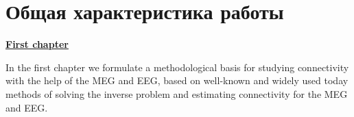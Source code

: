 
\section*{Общая характеристика работы}

\newcommand{\actuality}{\underline{\textbf{\actualityTXTEng}}}
\newcommand{\progress}{\underline{\textbf{\progressTXTEng}}}
\newcommand{\aim}{\underline{{\textbf\aimTXTEng}}}
\newcommand{\tasks}{\underline{\textbf{\tasksTXTEng}}}
\newcommand{\novelty}{\underline{\textbf{\noveltyTXTEng}}}
\newcommand{\influence}{\underline{\textbf{\influenceTXTEng}}}
\newcommand{\methods}{\underline{\textbf{\methodsTXTEng}}}
\newcommand{\defpositions}{\underline{\textbf{\defpositionsTXTEng}}}
\newcommand{\reliability}{\underline{\textbf{\reliabilityTXTEng}}}
\newcommand{\probation}{\underline{\textbf{\probationTXTEng}}}
\newcommand{\contribution}{\underline{\textbf{\contributionTXTEng}}}
\newcommand{\publications}{\underline{\textbf{\publicationsTXTEng}}}






\underline{\textbf{First chapter}}

In the first chapter we formulate a methodological basis for studying
connectivity with the help of the MEG and EEG, based on well-known and widely
used today methods of solving the inverse problem and estimating connectivity
for the MEG and EEG.

